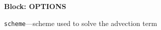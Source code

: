 
\item \textbf{Block: OPTIONS}

\begin{description}
\item \texttt{scheme}---scheme used to solve the advection term

\end{description}

